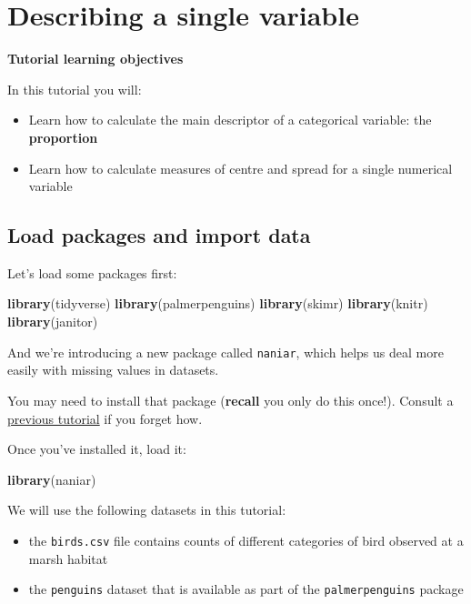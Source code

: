 \documentclass[
]{book}
\newenvironment{Shaded}{\begin{snugshade}}{\end{snugshade}}
\newcommand{\FunctionTok}[1]{\textcolor[rgb]{0.13,0.29,0.53}{\textbf{#1}}}
\newcommand{\NormalTok}[1]{#1}
\providecommand{\tightlist}{%
  \setlength{\itemsep}{0pt}\setlength{\parskip}{0pt}}
\begin{document}
\chapter{Describing a single variable}\label{vis_describe}

\textbf{Tutorial learning objectives}

In this tutorial you will:

\begin{itemize}
\tightlist
\item
  Learn how to calculate the main descriptor of a categorical variable: the \textbf{proportion}
\item
  Learn how to calculate measures of centre and spread for a single numerical variable
\end{itemize}

\section{Load packages and import data}\label{desc_packages_data}

Let's load some packages first:

\begin{Shaded}
\begin{Highlighting}[]
\FunctionTok{library}\NormalTok{(tidyverse)}
\FunctionTok{library}\NormalTok{(palmerpenguins)}
\FunctionTok{library}\NormalTok{(skimr)}
\FunctionTok{library}\NormalTok{(knitr)}
\FunctionTok{library}\NormalTok{(janitor)}
\end{Highlighting}
\end{Shaded}

And we're introducing a new package called \texttt{naniar}, which helps us deal more easily with missing values in datasets.

You may need to install that package (\textbf{recall} you only do this once!). Consult a \hyperref[package_install]{previous tutorial} if you forget how.

Once you've installed it, load it:

\begin{Shaded}
\begin{Highlighting}[]
\FunctionTok{library}\NormalTok{(naniar)}
\end{Highlighting}
\end{Shaded}

We will use the following datasets in this tutorial:

\begin{itemize}
\tightlist
\item
  the \texttt{birds.csv} file contains counts of different categories of bird observed at a marsh habitat
\item
  the \texttt{penguins} dataset that is available as part of the \texttt{palmerpenguins} package
\end{itemize}
\end{document}
